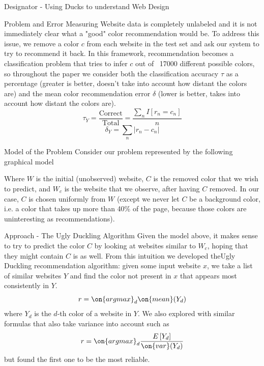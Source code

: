 \documentclass{beamer}
\begin{document}
\begin{frame}{\centerline{\Huge Designator - Using Ducks to understand Web Design}}
\begin{textblock}{5}
\begin{block}{Problem and Error Measuring}
Website data is completely unlabeled and it is not immediately clear what a "good" color recommendation would be. To address this issue, we remove a color $c$ from each website in the test set and ask our system to try to recommend it back. In this framework, recommendation becomes a classification problem that tries to infer $c$ out of ~17000 different possible colors, so throughout the paper we consider both the classification accuracy $\tau$ as a percentage (greater is better, doesn't take into account how distant the colors are) and the mean color recommendation error $\delta$ (lower is better, takes into account how distant the colors are).
$$\tau_Y = \frac{\text{Correct}}{\text{Total}} = \frac{\sum_n I[r_n = c_n]}{n}$$
$$\delta_Y = \sum_n |r_n - c_n|$$
\end{block}

\begin{block}{Model of the Problem}
Consider our problem represented by the following graphical model
\begin{figure}
\centering
{}
\end{figure}
Where $W$ is the initial (unobserved) website, $C$ is the removed color that we wish to predict, and $W_c$ is the website
that we observe, after having $C$ removed. In our case, $C$ is chosen uniformly from $W$ (except we never let $C$ be a
background color, i.e. a color that takes up more than 40\% of the page, because those colors are uninteresting as
recommendations).
\end{block}


\begin{block}{Approach - The Ugly Duckling Algorithm}
Given the model above, it makes sense to try to predict the color $C$ by looking at websites similar to $W_c$, hoping
that they might contain $C$ is as well. From this intuition we developed theUgly Duckling recommendation algorithm: given some input website $x$, we take a list of similar websites $Y$ and find the color not present in $x$ that appears most consistently in $Y$.
$$r = \on{argmax}_{d} \on{mean}(Y_d) $$
where $Y_d$ is the $d$-th color of a website in $Y$. We also explored with similar formulas that also take variance into account such as
$$r = \on{argmax}_{d} \frac{E\left[Y_d\right]}{\on{var}(Y_d)} $$
but found the first one to be the most reliable.


\end{block}
\end{textblock}
\end{frame}
\end{document}
